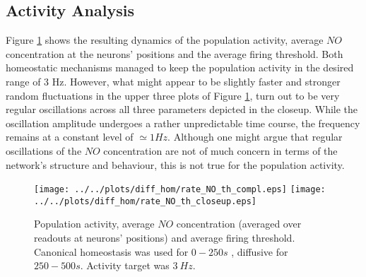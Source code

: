 \documentclass[10pt,a4paper]{article}
\begin{document}
\subsection{Activity Analysis} \label{activ_analys}
Figure \ref{full_sim_plots_av} shows the resulting dynamics of the population activity, average $NO$ concentration at the neurons' positions and the average firing threshold. Both homeostatic mechanisms managed to keep the population activity in the desired range of 3 Hz. However, what might appear to be slightly faster and stronger random fluctuations in the upper three plots of Figure \ref{full_sim_plots_av}, turn out to be very regular oscillations across all three parameters depicted in the closeup. While the oscillation amplitude undergoes a rather unpredictable time course, the frequency remains at a constant level of $\simeq 1Hz$. Although one might argue that regular oscillations of the $NO$ concentration are not of much concern in terms of the network's structure and behaviour, this is not true for the population activity.
\begin{figure}
\texttt{[image: ../../plots/diff\_hom/rate\_NO\_th\_compl.eps]}
\texttt{[image: ../../plots/diff\_hom/rate\_NO\_th\_closeup.eps]}
\caption{Population activity, average $NO$ concentration (averaged over readouts at neurons' positions) and average firing threshold. Canonical homeostasis was used for $0-250s$ , diffusive for $250-500s$. Activity target was $3 ~Hz$.}
\label{full_sim_plots_av}
\end{figure}
\end{document}
